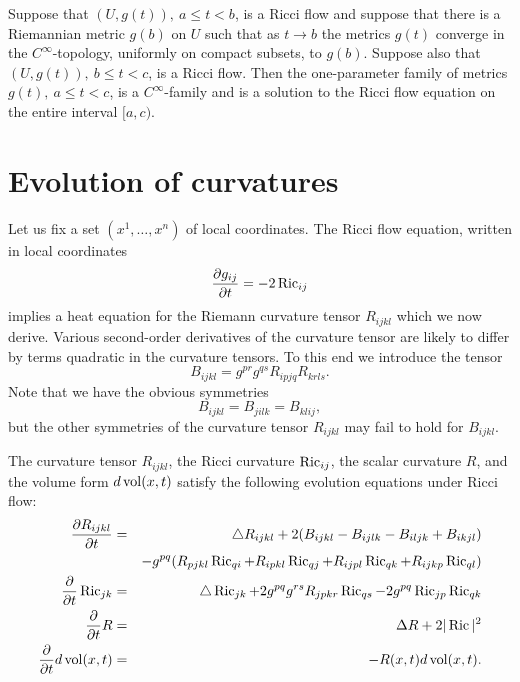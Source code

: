 \begin{proposition}\label{prop:smooth-patching}



\label{patch}

 Suppose that $(U,g(t)),\ a\le t<b$, is a Ricci flow and suppose that
 there is a Riemannian metric $g(b)$ on $U$ such that
 as $t\rightarrow b$ the metrics $g(t)$ converge in the $C^\infty$-topology, uniformly
 on compact subsets, to $g(b)$. Suppose also that $(U,g(t)),\ b\le t<c$, is a
 Ricci flow. Then the one-parameter family of metrics $g(t), \ a\le
 t<c$, is a $C^\infty$-family and is a solution to the Ricci flow
 equation on the entire interval $[a,c)$.
 \end{proposition}


\section{Evolution of curvatures}\label{evolcurv}


Let us fix a set
$(x^1,\ldots,x^n)$ of local coordinates. The Ricci flow equation,
written in local coordinates
\[ \frac{\partial g_{ij}}{\partial t} =
-2\operatorname{Ric}_{ij}
\]  implies a heat equation for the Riemann
curvature tensor $R_{ijkl}$ which we now derive. Various second-order
derivatives of the curvature tensor are likely to differ by
terms quadratic in the curvature tensors. To this end we introduce
the tensor $$B_{ijkl} = g^{pr}g^{qs}R_{ipjq}R_{krls}.$$ Note that we
have the obvious symmetries
$$B_{ijkl} = B_{jilk} = B_{klij},$$ but the other symmetries of
the curvature tensor $R_{ijkl}$ may fail to hold for $B_{ijkl}$.

\smallskip

\begin{theorem}\label{thm:curvature-evolution}


\label{thmRmevol}

The curvature tensor $R_{ijkl}$, the Ricci curvature $\operatorname{Ric}_{ij}$, the scalar
curvature $R$, and the volume form $d\operatorname{vol}(x,t)$ satisfy the following evolution
equations under Ricci flow:
\begin{eqnarray}
\frac{\partial R_{ijkl}}{\partial t} &= & \triangle R_{ijkl} +2(B_{ijkl} -
B_{ijlk}-B_{iljk} + B_{ikjl})\nonumber \\&  &  - g^{pq}(R_{pjkl}\operatorname{Ric}_{qi} +
R_{ipkl}\operatorname{Ric}_{qj} + R_{ijpl}\operatorname{Ric}_{qk} +
R_{ijkp}\operatorname{Ric}_{ql}) \label{Rmevol} \\
\label{Ricevol} \frac{\partial}{\partial t}\operatorname{Ric}_{jk} & = & \triangle
\operatorname{Ric}_{jk}+2g^{pq}g^{rs}R_{jpkr}\operatorname{Ric}_{qs}-2g^{pq}\operatorname{Ric}_{jp}\operatorname{Ric}_{qk} \\
\label{Revol}\frac{\partial}{\partial t}R & = & \Delta R+2|\operatorname{Ric}|^2 \\
\label{dvolevol} \frac{\partial}{\partial t}d\operatorname{vol}(x,t) & = &
-R(x,t)d\operatorname{vol}(x,t).
\end{eqnarray}
\end{theorem}

